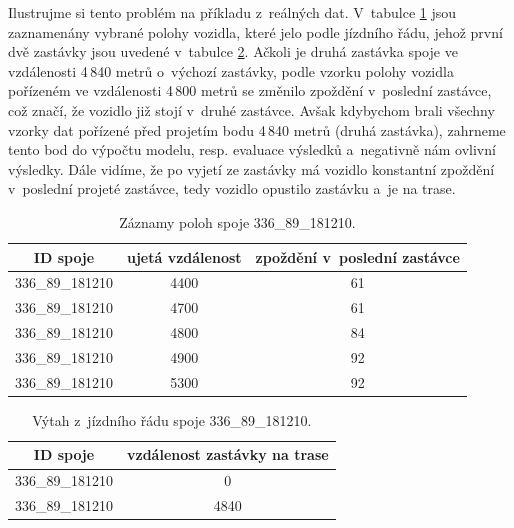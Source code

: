 Ilustrujme si tento problém na příkladu z~reálných dat. V~tabulce \ref{table:9270_samples} jsou zaznamenány vybrané polohy vozidla, které jelo podle jízdního řádu, jehož první dvě zastávky jsou uvedené v~tabulce \ref{table:9270_ride}. Ačkoli je druhá zastávka spoje ve vzdálenosti 4\,840 metrů o~výchozí zastávky, podle vzorku polohy vozidla pořízeném ve vzdálenosti 4\,800 metrů se změnilo zpoždění v~poslední zastávce, což značí, že vozidlo již stojí v~druhé zastávce. Avšak kdybychom brali všechny vzorky dat pořízené před projetím bodu 4\,840 metrů (druhá zastávka), zahrneme tento bod do výpočtu modelu, resp. evaluace výsledků a~negativně nám ovlivní výsledky. Dále vidíme, že po vyjetí ze zastávky má vozidlo konstantní zpoždění v~poslední projeté zastávce, tedy vozidlo opustilo zastávku a~je na trase.

\begin{center}
   \begin{table}[ht]
\centering
\begin{tabular}{|c|c|c|}
\hline
ID spoje & ujetá vzdálenost & zpoždění v~poslední zastávce \\ \hline \hline
336\_89\_181210 & 4400 & 61 \\ \hline
336\_89\_181210 & 4700 & 61 \\ \hline
336\_89\_181210 & 4800 & 84 \\ \hline
336\_89\_181210 & 4900 & 92 \\ \hline
336\_89\_181210 & 5300 & 92 \\ \hline
\end{tabular}
\label{table:9270_samples}
\caption{Záznamy poloh spoje 336\_89\_181210.}
\end{table}
\end{center}


\begin{center}
   \begin{table}[ht]
\centering
\begin{tabular}{|c|c|}
\hline
ID spoje & vzdálenost zastávky na trase \\ \hline \hline
336\_89\_181210 & 0 \\ \hline
336\_89\_181210 & 4840 \\ \hline
\end{tabular}
\label{table:9270_ride}
\caption{Výtah z~jízdního řádu spoje 336\_89\_181210.}
\end{table}
\end{center}


\bigbreak


